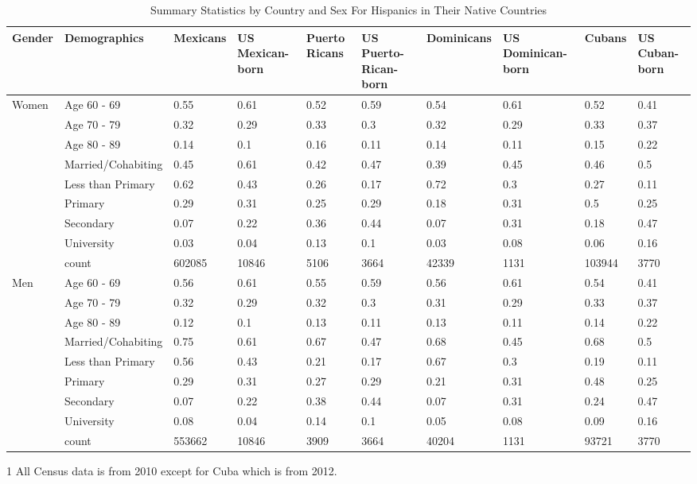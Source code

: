 \documentclass[
]{article}
\begin{document}
\begin{landscape} 

\begin{table}[ht] %
\centering
\begin{threeparttable}
\caption{Summary Statistics by Country and Sex For Hispanics in Their Native Countries} 
\begin{tabular}{l|l|llllllll}
  \hline
Gender & Demographics & Mexicans & US Mexican-born & Puerto Ricans & US Puerto-Rican-born & Dominicans & US Dominican-born & Cubans & US Cuban-born \\ 
  \hline
Women & Age 60 - 69 & 0.55 & 0.61 & 0.52 & 0.59 & 0.54 & 0.61 & 0.52 & 0.41 \\ 
   & Age 70 - 79 & 0.32 & 0.29 & 0.33 & 0.3 & 0.32 & 0.29 & 0.33 & 0.37 \\ 
   & Age 80 - 89 & 0.14 & 0.1 & 0.16 & 0.11 & 0.14 & 0.11 & 0.15 & 0.22 \\ 
   & Married/Cohabiting & 0.45 & 0.61 & 0.42 & 0.47 & 0.39 & 0.45 & 0.46 & 0.5 \\ 
   & Less than Primary & 0.62 & 0.43 & 0.26 & 0.17 & 0.72 & 0.3 & 0.27 & 0.11 \\ 
   & Primary & 0.29 & 0.31 & 0.25 & 0.29 & 0.18 & 0.31 & 0.5 & 0.25 \\ 
   & Secondary & 0.07 & 0.22 & 0.36 & 0.44 & 0.07 & 0.31 & 0.18 & 0.47 \\ 
   & University & 0.03 & 0.04 & 0.13 & 0.1 & 0.03 & 0.08 & 0.06 & 0.16 \\ 
   & count & 602085 & 10846 & 5106 & 3664 & 42339 & 1131 & 103944 & 3770 \\ 
  Men & Age 60 - 69 & 0.56 & 0.61 & 0.55 & 0.59 & 0.56 & 0.61 & 0.54 & 0.41 \\ 
   & Age 70 - 79 & 0.32 & 0.29 & 0.32 & 0.3 & 0.31 & 0.29 & 0.33 & 0.37 \\ 
   & Age 80 - 89 & 0.12 & 0.1 & 0.13 & 0.11 & 0.13 & 0.11 & 0.14 & 0.22 \\ 
   & Married/Cohabiting & 0.75 & 0.61 & 0.67 & 0.47 & 0.68 & 0.45 & 0.68 & 0.5 \\ 
   & Less than Primary & 0.56 & 0.43 & 0.21 & 0.17 & 0.67 & 0.3 & 0.19 & 0.11 \\ 
   & Primary & 0.29 & 0.31 & 0.27 & 0.29 & 0.21 & 0.31 & 0.48 & 0.25 \\ 
   & Secondary & 0.07 & 0.22 & 0.38 & 0.44 & 0.07 & 0.31 & 0.24 & 0.47 \\ 
   & University & 0.08 & 0.04 & 0.14 & 0.1 & 0.05 & 0.08 & 0.09 & 0.16 \\ 
   & count & 553662 & 10846 & 3909 & 3664 & 40204 & 1131 & 93721 & 3770 \\ 
   \hline
\end{tabular}
\begin{tablenotes}
\item[1] All Census data is from 2010 except for Cuba which is from 2012.
\end{tablenotes}
\end{threeparttable}
\end{table}


\end{landscape}
\end{document}
